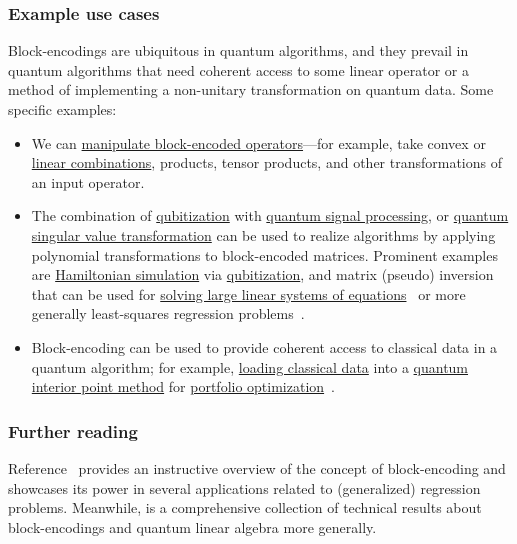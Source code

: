 \begin{refsection}
\subsubsection*{Example use cases}
 Block-encodings are ubiquitous in quantum algorithms, and they prevail in quantum algorithms that need coherent access to some linear operator or a method of implementing a non-unitary transformation on quantum data. Some specific examples:
\begin{itemize}
    \item We can \hyperref[prim:ManipulatingBlockEncodings]{manipulate block-encoded operators}---for example, take convex or \hyperref[prim:LCU]{linear combinations}, products, tensor products, and other transformations of an input operator.
    \item The combination of \hyperref[prim:Qubitization]{qubitization} with \hyperref[prim:QSP]{quantum signal processing}, or \hyperref[prim:QSVT]{quantum singular value transformation} can be used to realize algorithms by applying polynomial transformations to block-encoded matrices. Prominent examples are \hyperref[prim:HamiltonianSimulation]{Hamiltonian simulation} via \hyperref[prim:Qubitization]{qubitization}, and matrix (pseudo) inversion~\cite[Theorem 41]{gilyen2018QSingValTransf} that can be used for \hyperref[prim:QuantumLinearSystemSolvers]{solving large linear systems of equations}~\cite{harrow2009QLinSysSolver} or more generally least-squares regression problems~\cite{chakraborty2018BlockMatrixPowers}.
    \item Block-encoding can be used to provide coherent access to classical data in a quantum algorithm; for example, \hyperref[prim:BlockEncodingsClassical]{loading classical data} into a \hyperref[prim:QIPM]{quantum interior point method} for \hyperref[appl:PortfolioOptimization]{portfolio optimization}~\cite{dalzell2022socp}.
\end{itemize}


\subsubsection*{Further reading}

Reference~\cite{chakraborty2018BlockMatrixPowers} provides an instructive overview of the concept of block-encoding and showcases its power in several applications related to (generalized) regression problems. Meanwhile, \cite{gilyen2018QSingValTransf} is a comprehensive collection of technical results about block-encodings and quantum linear algebra more generally. 

\printbibliography[heading=secbib,segment=\therefsegment]

\end{refsection}


